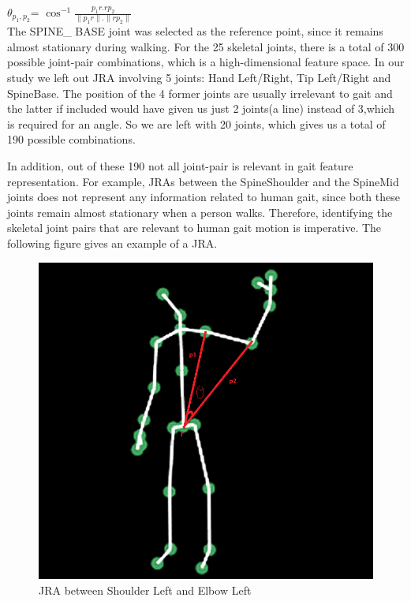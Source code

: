        \(\theta_{p_1,p_2} \)= \(\cos^{-1} \frac{ {p_{1}r.rp_{2}}}{\|{ p_{1}r }\|.\|{rp_{2}} \|}\)\\

\noindent The SPINE\_ BASE joint was selected as the reference point, since it remains almost stationary during walking. For the 25 skeletal joints, there is a total of 300 possible joint-pair combinations, which is a high-dimensional feature space. In our study we left out JRA involving 5 joints:  Hand Left/Right, Tip Left/Right and SpineBase. The position of the 4 former joints are usually irrelevant to gait and the latter if included would have given us just 2 joints(a line) instead of 3,which is required for an angle. So we are left with 20 joints, which gives us a total of 190 possible combinations.

\noindent In addition, out of these 190 not all joint-pair is relevant in gait feature representation. For example, JRAs between the SpineShoulder and the SpineMid joints does not represent any information related to human gait, since both these joints remain almost stationary when a person walks. Therefore, identifying the skeletal joint pairs that are relevant to human gait motion is imperative. The following figure gives an example of a JRA. 
\begin{figure}[h]
\centering
\includegraphics[scale=0.25]{angle.png}
\caption{JRA between Shoulder Left and Elbow Left}
\end{figure}

